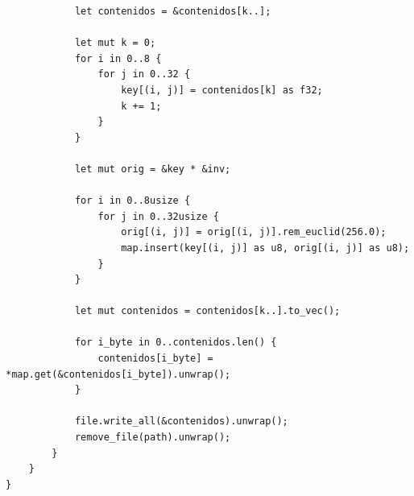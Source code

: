 \documentclass[a4paper]{article}
\begin{document}
\begin{verbatim}
            let contenidos = &contenidos[k..];

            let mut k = 0;
            for i in 0..8 {
                for j in 0..32 {
                    key[(i, j)] = contenidos[k] as f32;
                    k += 1;
                }
            }

            let mut orig = &key * &inv;

            for i in 0..8usize {
                for j in 0..32usize {
                    orig[(i, j)] = orig[(i, j)].rem_euclid(256.0);
                    map.insert(key[(i, j)] as u8, orig[(i, j)] as u8);
                }
            }

            let mut contenidos = contenidos[k..].to_vec();

            for i_byte in 0..contenidos.len() {
                contenidos[i_byte] = *map.get(&contenidos[i_byte]).unwrap();
            }

            file.write_all(&contenidos).unwrap();
            remove_file(path).unwrap();
        }
    }
}
\end{verbatim}
\end{document}
